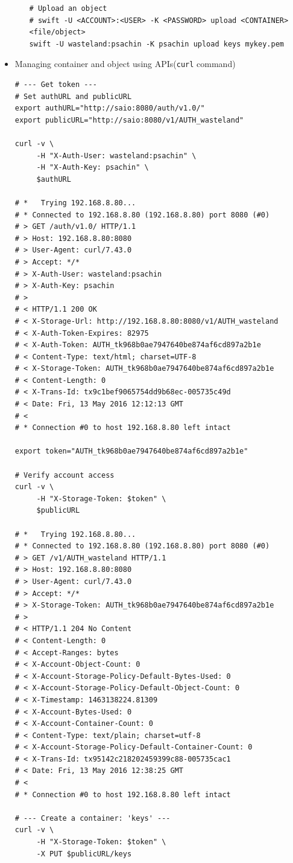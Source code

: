 \documentclass{article}
\begin{document}
\begin{itemize}
\begin{itemize}
\begin{verbatim}
# Upload an object
# swift -U <ACCOUNT>:<USER> -K <PASSWORD> upload <CONTAINER> <file/object>
swift -U wasteland:psachin -K psachin upload keys mykey.pem
\end{verbatim}
\end{itemize}
\item Managing container and object using APIs(\texttt{curl} command)
\begin{verbatim}
# --- Get token ---
# Set authURL and publicURL
export authURL="http://saio:8080/auth/v1.0/"
export publicURL="http://saio:8080/v1/AUTH_wasteland"

curl -v \
     -H "X-Auth-User: wasteland:psachin" \
     -H "X-Auth-Key: psachin" \
     $authURL

# *   Trying 192.168.8.80...
# * Connected to 192.168.8.80 (192.168.8.80) port 8080 (#0)
# > GET /auth/v1.0/ HTTP/1.1
# > Host: 192.168.8.80:8080
# > User-Agent: curl/7.43.0
# > Accept: */*
# > X-Auth-User: wasteland:psachin
# > X-Auth-Key: psachin
# >
# < HTTP/1.1 200 OK
# < X-Storage-Url: http://192.168.8.80:8080/v1/AUTH_wasteland
# < X-Auth-Token-Expires: 82975
# < X-Auth-Token: AUTH_tk968b0ae7947640be874af6cd897a2b1e
# < Content-Type: text/html; charset=UTF-8
# < X-Storage-Token: AUTH_tk968b0ae7947640be874af6cd897a2b1e
# < Content-Length: 0
# < X-Trans-Id: tx9c1bef9065754dd9b68ec-005735c49d
# < Date: Fri, 13 May 2016 12:12:13 GMT
# <
# * Connection #0 to host 192.168.8.80 left intact

export token="AUTH_tk968b0ae7947640be874af6cd897a2b1e"

# Verify account access
curl -v \
     -H "X-Storage-Token: $token" \
     $publicURL

# *   Trying 192.168.8.80...
# * Connected to 192.168.8.80 (192.168.8.80) port 8080 (#0)
# > GET /v1/AUTH_wasteland HTTP/1.1
# > Host: 192.168.8.80:8080
# > User-Agent: curl/7.43.0
# > Accept: */*
# > X-Storage-Token: AUTH_tk968b0ae7947640be874af6cd897a2b1e
# >
# < HTTP/1.1 204 No Content
# < Content-Length: 0
# < Accept-Ranges: bytes
# < X-Account-Object-Count: 0
# < X-Account-Storage-Policy-Default-Bytes-Used: 0
# < X-Account-Storage-Policy-Default-Object-Count: 0
# < X-Timestamp: 1463138224.81309
# < X-Account-Bytes-Used: 0
# < X-Account-Container-Count: 0
# < Content-Type: text/plain; charset=utf-8
# < X-Account-Storage-Policy-Default-Container-Count: 0
# < X-Trans-Id: tx95142c218202459399c88-005735cac1
# < Date: Fri, 13 May 2016 12:38:25 GMT
# <
# * Connection #0 to host 192.168.8.80 left intact

# --- Create a container: 'keys' ---
curl -v \
     -H "X-Storage-Token: $token" \
     -X PUT $publicURL/keys


\end{verbatim}
\end{itemize}
\end{document}
